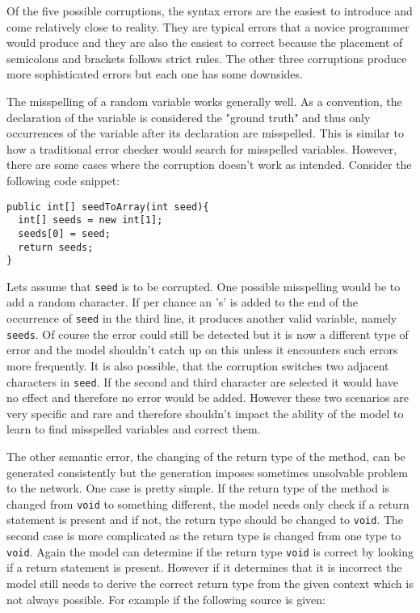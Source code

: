 Of the five possible corruptions, the syntax errors are the easiest to introduce and come relatively close to reality. They are typical errors that a novice programmer would produce and they are also the easiest to correct because the placement of semicolons and brackets follows strict rules. The other three corruptions produce more sophisticated errors but each one has some downsides.

The misspelling of a random variable works generally well. As a convention, the declaration of the variable is considered the "ground truth" and thus only occurrences of the variable after its declaration are misspelled. This is similar to how a traditional error checker would search for misspelled variables. However, there are some cases where the corruption doesn't work as intended. Consider the following code snippet:

\begin{lstlisting}[style=inline]
public int[] seedToArray(int seed){
  int[] seeds = new int[1];
  seeds[0] = seed;
  return seeds;
}
\end{lstlisting}

Lets assume that \texttt{seed} is to be corrupted. One possible misspelling would be to add a random character. If per chance an 's' is added to the end of the occurrence of \texttt{seed} in the third line, it produces another valid variable, namely \texttt{seeds}. Of course the error could still be detected but it is now a different type of error and the model shouldn't catch up on this unless it encounters such errors more frequently. It is also possible, that the corruption switches two adjacent characters in \texttt{seed}. If the second and third character are selected it would have no effect and therefore no error would be added. However these two scenarios are very specific and rare and therefore shouldn't impact the ability of the model to learn to find misspelled variables and correct them.

The other semantic error, the changing of the return type of the method, can be generated consistently but the generation imposes sometimes unsolvable problem to the network. One case is pretty simple. If the return type of the method is changed from \texttt{void} to something different, the model needs only check if a return statement is present and if not, the return type should be changed to \texttt{void}. The second case is more complicated as the return type is changed from one type to \texttt{void}. Again the model can determine if the return type \texttt{void} is correct by looking if a return statement is present. However if it determines that it is incorrect the model still needs to derive the correct return type from the given context which is not always possible. For example if the following source is given:

